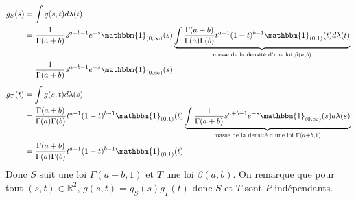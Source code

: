 \documentclass{report}
\begin{document}
$$\begin{aligned}
g_S(s) &= \int g(s,t) d\lambda(t) \\
&= \frac{1}{\Gamma(a+b)}s^{a+b-1}e^{-s}\mathbbm{1}_{(0,\infty)}(s) \underbrace{\int \frac{\Gamma(a+b)}{\Gamma(a)\Gamma(b)} t^{a-1} (1-t)^{b-1}\mathbbm{1}_{(0,1)}(t) d\lambda(t)}_{\text{masse de la densité d'une loi } \beta(a,b)}\\
&= \frac{1}{\Gamma(a+b)}s^{a+b-1}e^{-s}\mathbbm{1}_{(0,\infty)}(s)
\end{aligned}
$$  $$\begin{aligned}
g_T(t) &= \int g(s,t) d\lambda(s) \\
&=  \frac{\Gamma(a+b)}{\Gamma(a)\Gamma(b)} t^{a-1} (1-t)^{b-1}\mathbbm{1}_{(0,1)}(t) \underbrace{\int \frac{1}{\Gamma(a+b)}s^{a+b-1}e^{-s}\mathbbm{1}_{(0,\infty)}(s) d\lambda(s)}_{\text{masse de la densité d'une loi } \Gamma(a+b,1)}\\
&= \frac{\Gamma(a+b)}{\Gamma(a)\Gamma(b)} t^{a-1} (1-t)^{b-1}\mathbbm{1}_{(0,1)}(t)
\end{aligned}
$$
Donc $S$ suit une loi $\Gamma(a+b,1)$ et $T$ une loi $\beta(a,b)$. On remarque que pour tout $(s,t)\in \mathbb R^2$, $g(s,t) = g_S(s) g_T(t)$ donc $S$ et $T$ sont $P$-indépendants.
\end{document}
